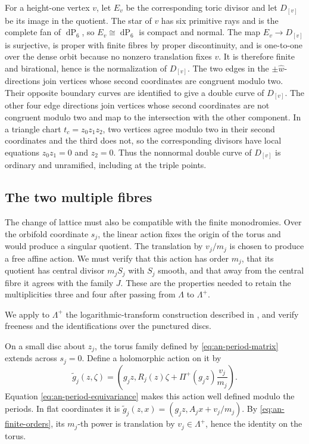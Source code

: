 \documentclass[11pt]{article}
\theoremstyle{definition}
\theoremstyle{remark}
\numberwithin{equation}{section}
\newcommand{\dP}{\operatorname{dP}_6}
\begin{document}
For a height-one vertex $v$, let $E_v$
be the corresponding toric divisor and let $D_{[v]}$ be its image in the
quotient.  The star of $v$ has six primitive rays and is the complete fan
of $\dP$, so $E_v\cong\dP$ is compact and normal.  The map
$E_v\to D_{[v]}$ is surjective, is proper with finite fibres by proper
discontinuity, and is one-to-one over the dense orbit because no nonzero
translation fixes $v$.  It is therefore finite and birational, hence is
the normalization of $D_{[v]}$.  The two edges in the
$\pm\widehat w$-directions join vertices whose second coordinates are
congruent modulo two.  Their opposite boundary curves are identified to give
a double curve of $D_{[v]}$.  The other four edge directions join vertices
whose second coordinates are not congruent modulo two and map to the
intersection with the other component.  In a
triangle chart $t_c=z_0z_1z_2$, two vertices agree modulo two in their
second coordinates and the third does not, so the corresponding divisors
have local equations
$z_0z_1=0$ and $z_2=0$.  Thus the nonnormal double curve of
$D_{[v]}$ is ordinary and unramified, including at the triple points.

\subsection{The two multiple fibres}

The change of lattice must also be compatible with the finite monodromies.
Over the orbifold coordinate $s_j$, the linear action fixes the origin of
the torus and would produce a singular quotient.  The translation by
$v_j/m_j$ is chosen to produce a free affine action.  We must verify that this
action has order $m_j$, that its quotient has central divisor $m_jS_j$
with $S_j$ smooth, and that away from the central fibre it agrees with the
family $J$.  These are the properties needed to retain the multiplicities
three and four after passing from $\Lambda$ to $\Lambda^+$.

We apply to $\Lambda^+$ the logarithmic-transform construction described in
\citep[Definition~5.3 and Theorem~5.4]{Alpoge2026}, and verify freeness and
the identifications over the punctured discs.

On a small disc about $z_j$, the torus family defined by
\eqref{eq:an-period-matrix} extends across $s_j=0$.  Define a holomorphic
action on it by
\begin{equation}\label{eq:an-holomorphic-affine-action}
 \widetilde g_j(z,\zeta)
 =\left(g_jz,
 R_j(z)\zeta+\Pi^+(g_jz)\frac{v_j}{m_j}\right).
\end{equation}
Equation \eqref{eq:an-period-equivariance} makes this action well defined
modulo the periods.  In flat coordinates it is
$\widetilde g_j(z,x)=(g_jz,A_jx+v_j/m_j)$.
By \eqref{eq:an-finite-orders}, its $m_j$-th power is translation by
$v_j\in\Lambda^+$, hence the identity on the torus.
\end{document}
